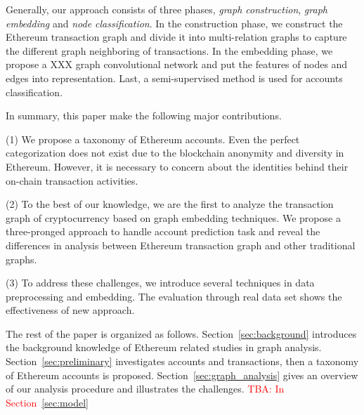 Generally, our approach consists of three phases, \emph{graph construction}, \emph{graph embedding} and \emph{node classification}. In the construction phase, we construct the Ethereum transaction graph and divide it into multi-relation graphs to capture the different graph neighboring of transactions. In the embedding phase, we propose a XXX graph convolutional network and put the features of nodes and edges into representation. Last, a semi-supervised method is used for accounts classification.

In summary, this paper make the following major contributions.

(1) We propose a taxonomy of Ethereum accounts. Even the perfect categorization does not exist due to the blockchain anonymity and diversity in Ethereum. However, it is necessary to concern about the identities behind their on-chain transaction activities.

(2) To the best of our knowledge, we are the first to analyze the transaction graph of cryptocurrency based on graph embedding techniques. We propose a three-pronged approach to handle account prediction task and reveal the differences in analysis between Ethereum transaction graph and other traditional graphs.

(3) To address these challenges, we introduce several techniques in data preprocessing and embedding. The evaluation through real data set shows the effectiveness of new approach.

The rest of the paper is organized as follows. Section~\ref{sec:background} introduces the background knowledge of Ethereum related studies in graph analysis. Section~\ref{sec:preliminary} investigates accounts and transactions, then a taxonomy of Ethereum accounts is proposed. Section~\ref{sec:graph_analysis} gives an overview of our analysis procedure and illustrates the challenges. \textcolor{red}{TBA: In Section~\ref{sec:model}}

